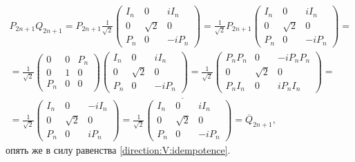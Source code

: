 \begin{multline*}
    P_{2n+1} Q_{2n + 1}
    = P_{2n+1}
    \frac{1}{\sqrt{2}}
    \begin{pmatrix}
        I_n & 0        & i I_n   \\
        0   & \sqrt{2} & 0       \\
        P_n & 0        & - i P_n
    \end{pmatrix}
    = \frac{1}{\sqrt{2}}
    P_{2n+1}
    \begin{pmatrix}
        I_n & 0        & i I_n   \\
        0   & \sqrt{2} & 0       \\
        P_n & 0        & - i P_n
    \end{pmatrix} = \\
    = \frac{1}{\sqrt{2}}
    \begin{pmatrix}
        0   & 0 & P_n \\
        0   & 1 & 0   \\
        P_n & 0 & 0
    \end{pmatrix}
    \begin{pmatrix}
        I_n & 0        & i I_n   \\
        0   & \sqrt{2} & 0       \\
        P_n & 0        & - i P_n
    \end{pmatrix}
    = \frac{1}{\sqrt{2}}
    \begin{pmatrix}
        P_n P_n & 0        & - i P_n P_n \\
        0       & \sqrt{2} & 0           \\
        P_n I_n & 0        & i P_n I_n
    \end{pmatrix} = \\
    = \frac{1}{\sqrt{2}}
    \begin{pmatrix}
        I_n & 0        & - i I_n \\
        0   & \sqrt{2} & 0       \\
        P_n & 0        & i P_n
    \end{pmatrix}
    = \overline{
        \frac{1}{\sqrt{2}}
        \begin{pmatrix}
            I_n & 0        & i I_n   \\
            0   & \sqrt{2} & 0       \\
            P_n & 0        & - i P_n
        \end{pmatrix}
    }
    = \overline{Q}_{2n+1} ,
\end{multline*}
опять же в силу равенства \eqref{direction:V:idempotence}.

